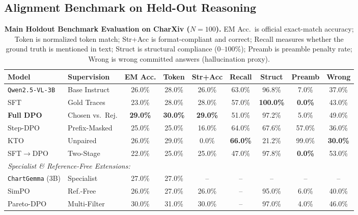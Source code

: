 \documentclass[11pt]{article}
\begin{document}
\subsection{Alignment Benchmark on Held-Out Reasoning}
\label{subsec:alignment_benchmark}

\begin{table}[t]
\centering
\footnotesize
\setlength{\tabcolsep}{3.2pt}
\begin{tabular}{llccccccc}
\toprule
\textbf{Model} & \textbf{Supervision} & \textbf{EM Acc.} & \textbf{Token} & \textbf{Str+Acc} & \textbf{Recall} & \textbf{Struct} & \textbf{Preamb} & \textbf{Wrong} \\
\midrule
\texttt{Qwen2.5-VL-3B} & Base Instruct & 26.0\% & 28.0\% & 26.0\% & 63.0\% & 96.8\% & 7.0\% & 37.0\% \\
SFT & Gold Traces & 23.0\% & 28.0\% & 28.0\% & 57.0\% & \textbf{100.0\%} & \textbf{0.0\%} & 43.0\% \\
\textbf{Full DPO} & Chosen vs.\ Rej. & \textbf{29.0\%} & \textbf{30.0\%} & \textbf{29.0\%} & 51.0\% & 97.2\% & 5.0\% & 49.0\% \\
Step-DPO & Prefix-Masked & 25.0\% & 25.0\% & 16.0\% & 64.0\% & 67.6\% & 57.0\% & 36.0\% \\
KTO & Unpaired & 26.0\% & 29.0\% & 0.0\% & \textbf{66.0\%} & 21.2\% & 99.0\% & \textbf{30.0\%} \\
SFT$\rightarrow$DPO & Two-Stage & 22.0\% & 25.0\% & 25.0\% & 47.0\% & 97.8\% & \textbf{0.0\%} & 53.0\% \\
\midrule
\multicolumn{9}{l}{\textit{Specialist \& Reference-Free Extensions:}} \\
\texttt{ChartGemma} (3B) & Specialist & 27.0\% & 27.0\% & -- & -- & -- & -- & -- \\
SimPO & Ref.-Free & 26.0\% & 27.0\% & 26.0\% & -- & 95.0\% & 6.0\% & 40.0\% \\
Pareto-DPO & Multi-Filter & 30.0\% & 31.0\% & 30.0\% & -- & 97.0\% & 4.0\% & 46.0\% \\
\bottomrule
\end{tabular}
\caption{\textbf{Main Holdout Benchmark Evaluation on CharXiv ($N=100$).} EM Acc.\ is official exact-match accuracy; Token is normalized token match; Str+Acc is format-compliant and correct; Recall measures whether the ground truth is mentioned in text; Struct is structural compliance ($0$--$100$\%); Preamb is preamble penalty rate; Wrong is wrong committed answers (hallucination proxy).}
\label{tab:main_benchmark}
\end{table}
\end{document}

